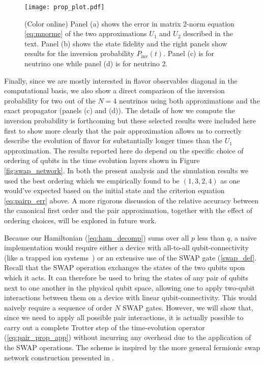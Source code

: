 \documentclass[10pt]{article}
\begin{document}
\begin{figure}[h]
\centering
\texttt{[image: prop\_plot.pdf]}
\caption{(Color online) Panel (a) shows the error in matrix 2-norm equation \eqref{eq:mnorme} of the two approximations $U_1$ and $U_2$ described in the text. Panel (b) shows the state fidelity and the right panels show results for the inversion probability $P_{\text{inv}}(t)$. Panel (c) is for neutrino one while panel (d) is for neutrino 2.}
\label{fig:prop_cmp}
\end{figure}

Finally, since we are mostly interested in flavor observables diagonal in the computational basis, we also show a direct comparison of the inversion probability for two out of the $N=4$ neutrinos using both approximations and the exact propagator (panels (c) and (d)). The details of how we compute the inversion probability is forthcoming but these selected results were included here first to show more clearly that the pair approximation allows us to correctly describe the evolution of flavor for substantially longer times than the $U_1$ approximation. The results reported here do depend on the specific choice of ordering of qubits in the time evolution layers shown in Figure \ref{fig:swap_network}. In both the present analysis and the simulation results we used the best ordering which we empirically found to be $(1,3,2,4)$ as one would've expected based on the initial state and the criterion equation \eqref{eq:pairp_err} above. A more rigorous discussion of the relative accuracy between the canonical first order and the pair approximation, together with the effect of ordering choices, will be explored in future work.

Because our Hamiltonian (\ref{eq:ham_decomp}) sums over all $p$ less than $q$, a naive implementation would require either a device with all-to-all qubit-connectivity (like a trapped ion systems~\cite{Monroe2019}) or an extensive use of the SWAP gate (\ref{swap_def}. Recall that the SWAP operation exchanges the states of the two qubits upon which it acts. It can therefore be used to bring the states of any pair of qubits next to one another in the physical qubit space, allowing one to apply two-qubit interactions between them on a device with linear qubit-connectivity. This would naively require a sequence of order $N$ SWAP gates. However, we will show that, since we need to apply all possible pair interactions, it is actually possible to carry out a complete Trotter step of the time-evolution operator (\eqref{eq:pair_prop_app}) without incurring any overhead due to the application of the SWAP operations. The scheme is inspired by the more general fermionic swap network construction presented in \cite{Kivlichan2018}. 
\end{document}
